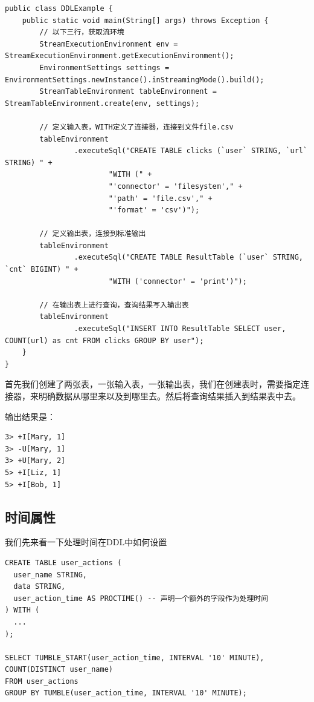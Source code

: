 \documentclass[cn,11pt,chinese]{elegantbook}
\begin{document}
\begin{verbatim}
public class DDLExample {
    public static void main(String[] args) throws Exception {
        // 以下三行，获取流环境
        StreamExecutionEnvironment env = StreamExecutionEnvironment.getExecutionEnvironment();
        EnvironmentSettings settings = EnvironmentSettings.newInstance().inStreamingMode().build();
        StreamTableEnvironment tableEnvironment = StreamTableEnvironment.create(env, settings);

        // 定义输入表，WITH定义了连接器，连接到文件file.csv
        tableEnvironment
                .executeSql("CREATE TABLE clicks (`user` STRING, `url` STRING) " +
                        "WITH (" +
                        "'connector' = 'filesystem'," +
                        "'path' = 'file.csv'," +
                        "'format' = 'csv')");

        // 定义输出表，连接到标准输出
        tableEnvironment
                .executeSql("CREATE TABLE ResultTable (`user` STRING, `cnt` BIGINT) " +
                        "WITH ('connector' = 'print')");

        // 在输出表上进行查询，查询结果写入输出表
        tableEnvironment
                .executeSql("INSERT INTO ResultTable SELECT user, COUNT(url) as cnt FROM clicks GROUP BY user");
    }
}
\end{verbatim}

首先我们创建了两张表，一张输入表，一张输出表，我们在创建表时，需要指定连接器，来明确数据从哪里来以及到哪里去。然后将查询结果插入到结果表中去。

输出结果是：

\begin{verbatim}
3> +I[Mary, 1]
3> -U[Mary, 1]
3> +U[Mary, 2]
5> +I[Liz, 1]
5> +I[Bob, 1]
\end{verbatim}

\subsection{时间属性}

我们先来看一下处理时间在DDL中如何设置

\begin{verbatim}
CREATE TABLE user_actions (
  user_name STRING,
  data STRING,
  user_action_time AS PROCTIME() -- 声明一个额外的字段作为处理时间
) WITH (
  ...
);

SELECT TUMBLE_START(user_action_time, INTERVAL '10' MINUTE), COUNT(DISTINCT user_name)
FROM user_actions
GROUP BY TUMBLE(user_action_time, INTERVAL '10' MINUTE);
\end{verbatim}
\end{document}
